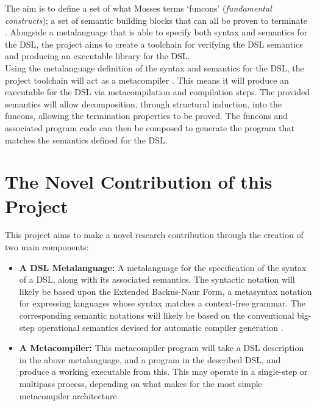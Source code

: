 The aim is to define a set of what Mosses terms `funcons' (\textit{fundamental constructs}); a set of semantic building blocks that can all be proven to terminate \cite{Churchill:2014:RCS:2577080.2577099}.
Alongside a metalanguage that is able to specify both syntax and semantics for the DSL, the project aims to create a toolchain for verifying the DSL semantics and producing an executable library for the DSL.\\

Using the metalanguage definition of the syntax and semantics for the DSL, the project toolchain will act as a metacompiler \cite{Mandell:1966:MDA:800267.810785}.
This means it will produce an executable for the DSL via metacompilation and compilation steps.
The provided semantics will allow decomposition, through structural induction, into the funcons, allowing the termination properties to be proved.
The funcons and associated program code can then be composed to generate the program that matches the semantics defined for the DSL.\\


\section{The Novel Contribution of this Project} %
\label{sec:the_novel_contribution_of_this_project}
This project aims to make a novel research contribution through the creation of two main components:
\begin{itemize}
    \item \textbf{A DSL Metalanguage:} A metalanguage for the specification of the syntax of a DSL, along with its associated semantics. 
    The syntactic notation will likely be based upon the Extended Backus-Naur Form, a metasyntax notation for expressing languages whose syntax matches a context-free grammar. 
    The corresponding semantic notations will likely be based on the conventional big-step operational semantics \citep{Schmidt:2003:PLS:1074100.1074733} devised for automatic compiler generation \citep{diehl1996semantics}.
    \item \textbf{A Metacompiler:} This metacompiler program will take a DSL description in the above metalanguage, and a program in the described DSL, and produce a working executable from this. 
    This may operate in a single-step or multipass process, depending on what makes for the most simple metacompiler architecture.
\end{itemize}

